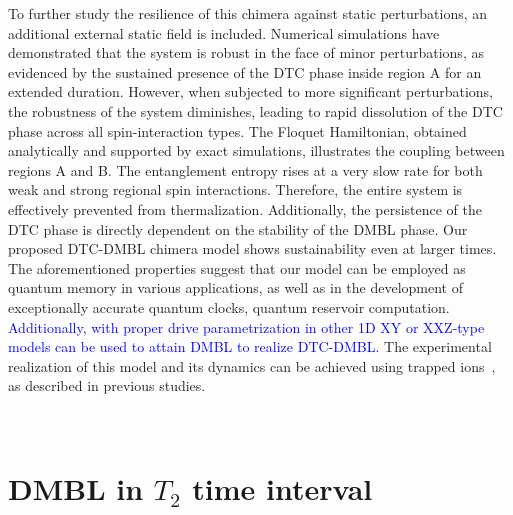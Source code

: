 \documentclass[12pt]{iopart}
\newcommand{\blue}[1]{\textcolor{blue}{#1}}
\begin{document}
To further study the resilience of this chimera against static perturbations, an additional external static field is included. Numerical simulations have demonstrated that the system is robust in the face of minor perturbations, as evidenced by the sustained presence of the DTC phase inside region A for an extended duration. However, when subjected to more significant perturbations, the robustness of the system diminishes, leading to rapid dissolution of the DTC phase across all spin-interaction types. The Floquet Hamiltonian, obtained analytically and supported by exact simulations, illustrates the coupling between regions A and B. The entanglement entropy rises at a very slow rate for both weak and strong regional spin interactions. Therefore, the entire system is effectively prevented from thermalization. Additionally, the persistence of the DTC phase is directly dependent on the stability of the DMBL phase. Our proposed DTC-DMBL chimera model shows sustainability even at larger times. The aforementioned properties suggest that our model can be employed as quantum memory in various applications, as well as in the development of exceptionally accurate quantum clocks, quantum reservoir computation\cite{Akitada2022}. \blue{Additionally, with proper drive parametrization in other 1D XY or XXZ-type models can be used to attain DMBL to realize DTC-DMBL.} The experimental realization of this model and its dynamics can be achieved using trapped ions~\cite{sakurai_phys_nodate, Friedenauer2008}, as described in previous studies.
	
\medskip
\



\appendix
\section{\label{sec:AppendixA} DMBL in $T_2$ time interval}
\end{document}
